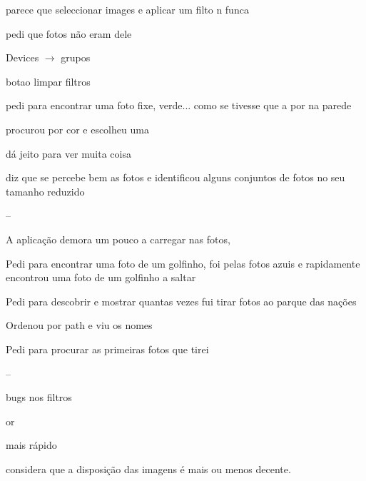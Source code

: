 {\begin{myitemize}
	\item parece que seleccionar images e aplicar um filto n funca



	\item pedi que fotos não eram dele

	\item Devices $\rightarrow$ grupos


	\item botao limpar filtros


	\item pedi para encontrar uma foto fixe, verde... como se tivesse que a por na parede

	\item procurou por cor e escolheu uma


	\item dá jeito para ver muita coisa

	\item diz que se percebe bem as fotos e identificou alguns conjuntos de fotos no seu tamanho reduzido


	\item --


	\item A aplicação demora um pouco a carregar nas fotos, 


	\item Pedi para encontrar uma foto de um golfinho, foi pelas fotos azuis e rapidamente encontrou uma foto de um golfinho a saltar


	\item Pedi para descobrir e mostrar quantas vezes fui tirar fotos ao parque das nações

	\item Ordenou por path e viu os nomes



	\item Pedi para procurar as primeiras fotos que tirei



	\item --


	\item bugs nos filtros

	\item or

	\item mais rápido

	\item considera que a disposição das imagens é mais ou menos decente.


\end{myitemize}}
